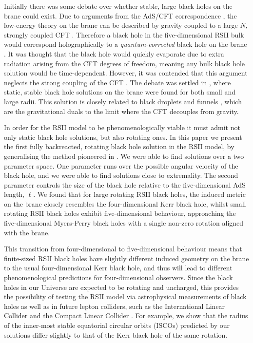 \documentclass[%
 reprint,
 amsmath,amssymb,
 aps,
]{revtex4-2}
\begin{document}
Initially there was some debate over whether stable, large black holes on the brane could exist. Due to arguments from the AdS/CFT correspondence \cite{Maldacena:1997re,Witten:1998qj,Aharony:1999ti}, the low-energy theory on the brane can be described by gravity coupled to a large $N$, strongly coupled CFT \cite{Verlinde:1999fy,Gubser:1999vj, Hawking:2000kj}. Therefore a black hole in the five-dimensional RSII bulk would correspond holographically to a \textit{quantum-corrected} black hole on the brane \cite{Emparan:2002px}. It was thought that the black hole would quickly evaporate due to extra radiation arising from the CFT degrees of freedom, meaning any bulk black hole solution would be time-dependent. However, it was contended that this argument neglects the strong coupling of the CFT \cite{Fitzpatrick:2006cd}. The debate was settled in \cite{Figueras:2011gd}, where static, stable black hole solutions on the brane were found for both small and large radii. This solution is closely related to black droplets and funnels \cite{Hubeny:2009ru,Hubeny:2009kz,Hubeny:2009rc,Caldarelli:2011wa,Figueras:2011va,Santos:2012he,Fischetti:2012ps,Fischetti:2012vt,Santos:2014yja,Fischetti:2016oyo,Marolf:2019wkz,Santos:2020kmq}, which are the gravitational duals to the limit where the CFT decouples from gravity.

In order for the RSII model to be phenomenologically viable it must admit not only static black hole solutions, but also rotating ones. In this paper we present the first fully backreacted, rotating black hole solution in the RSII model, by generalising the method pioneered in \cite{Headrick:2009pv}. We were able to find solutions over a two parameter space. One parameter runs over the possible angular velocity of the black hole, and we were able to find solutions close to extremality. The second parameter controls the size of the black hole relative to the five-dimensional AdS length, $\ell$. We found that for large rotating RSII black holes, the induced metric on the brane closely resembles the four-dimensional Kerr black hole, whilst small rotating RSII black holes exhibit five-dimensional behaviour, approaching the five-dimensional Myers-Perry black holes \cite{Myers:1986un} with a single non-zero rotation aligned with the brane.

This transition from four-dimensional to five-dimensional behaviour means that finite-sized RSII black holes have slightly different induced geometry on the brane to the usual four-dimensional Kerr black hole, and thus will lead to different phenomenological predictions for four-dimensional observers. Since the black holes in our Universe are expected to be rotating and uncharged, this provides the possibility of testing the RSII model via astrophysical measurements of black holes as well as in future lepton colliders, such as the International Linear Collider \cite{ILC} and the Compact Linear Collider \cite{Roloff:2019crr}. For example, we show that the radius of the inner-most stable equatorial circular orbits (ISCOs) predicted by our solutions differ slightly to that of the Kerr black hole of the same rotation.
\end{document}

